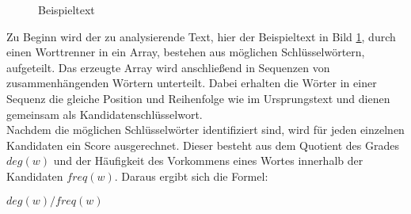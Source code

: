 		\begin{figure}[h!]
			\caption{Beispieltext}
			\label{fig:text}
		\end{figure}
		
		Zu Beginn wird der zu analysierende Text, hier der Beispieltext in  Bild \ref{fig:text}, durch einen Worttrenner in ein Array, bestehen aus möglichen Schlüsselwörtern, aufgeteilt. Das erzeugte Array wird anschließend in Sequenzen von zusammenhängenden Wörtern unterteilt. Dabei erhalten die Wörter in einer Sequenz die gleiche Position und Reihenfolge wie im Ursprungstext und dienen gemeinsam als Kandidatenschlüsselwort.\cite{rose2010automatic}\\		
		Nachdem die möglichen Schlüsselwörter identifiziert sind, wird für jeden einzelnen Kandidaten ein Score ausgerechnet. Dieser besteht aus dem Quotient des Grades $deg(w)$ und der Häufigkeit des Vorkommens eines Wortes innerhalb der Kandidaten $freq(w)$. Daraus ergibt sich die Formel:
		\begin{center}
			$deg(w)/freq(w) $
		\end{center}	
		

